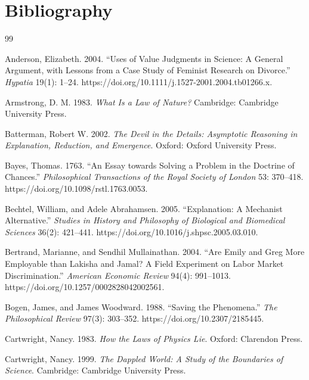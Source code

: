 \chapter*{Bibliography}
\small
\begin{thebibliography}{99}

Anderson, Elizabeth. 2004. \enquote{Uses of Value Judgments in Science: A General Argument, with Lessons from a Case Study of Feminist Research on Divorce.} \emph{Hypatia} 19(1): 1--24. https://doi.org/10.1111/j.1527-2001.2004.tb01266.x.

Armstrong, D. M. 1983. \emph{What Is a Law of Nature?} Cambridge: Cambridge University Press.

Batterman, Robert W. 2002. \emph{The Devil in the Details: Asymptotic Reasoning in Explanation, Reduction, and Emergence}. Oxford: Oxford University Press.

Bayes, Thomas. 1763. \enquote{An Essay towards Solving a Problem in the Doctrine of Chances.} \emph{Philosophical Transactions of the Royal Society of London} 53: 370--418. https://doi.org/10.1098/rstl.1763.0053.

Bechtel, William, and Adele Abrahamsen. 2005. \enquote{Explanation: A Mechanist Alternative.} \emph{Studies in History and Philosophy of Biological and Biomedical Sciences} 36(2): 421--441. https://doi.org/10.1016/j.shpsc.2005.03.010.

Bertrand, Marianne, and Sendhil Mullainathan. 2004. \enquote{Are Emily and Greg More Employable than Lakisha and Jamal? A Field Experiment on Labor Market Discrimination.} \emph{American Economic Review} 94(4): 991--1013. https://doi.org/10.1257/0002828042002561.

Bogen, James, and James Woodward. 1988. \enquote{Saving the Phenomena.} \emph{The Philosophical Review} 97(3): 303--352. https://doi.org/10.2307/2185445.

Cartwright, Nancy. 1983. \emph{How the Laws of Physics Lie}. Oxford: Clarendon Press.

Cartwright, Nancy. 1999. \emph{The Dappled World: A Study of the Boundaries of Science}. Cambridge: Cambridge University Press.


\end{thebibliography}
